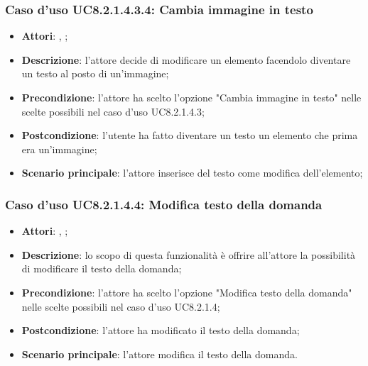 		\subsubsection{Caso d'uso UC8.2.1.4.3.4: Cambia immagine in testo}
		\label{UC8.2.1.4.3.4}
		\begin{itemize}
			\item \textbf{Attori}: \uau, \uaupro;
			\item \textbf{Descrizione}: l'attore decide di modificare un elemento facendolo diventare un testo al posto di un'immagine;
			\item \textbf{Precondizione}: l'attore ha scelto l'opzione "Cambia immagine in testo" nelle scelte possibili nel caso d'uso UC8.2.1.4.3;
			\item \textbf{Postcondizione}: l'utente ha fatto diventare un testo un elemento che prima era un'immagine;
			\item \textbf{Scenario principale}: l'attore inserisce del testo come modifica dell'elemento;  
		\end{itemize}
		
			
	\subsubsection{Caso d'uso UC8.2.1.4.4: Modifica testo della domanda}
	\begin{itemize}
		\item
		\textbf{Attori}: \uau, \uaupro;
		\item		
		\textbf{Descrizione}: lo scopo di questa funzionalità è offrire all'attore la possibilità di modificare il testo della domanda;
		\item
		\textbf{Precondizione}: l'attore ha scelto l'opzione "Modifica testo della domanda" nelle scelte possibili nel caso d'uso UC8.2.1.4;
		\item \textbf{Postcondizione}: l'attore ha modificato il testo della domanda;
		\item \textbf{Scenario principale}: l'attore modifica il testo della domanda. 
		
	\end{itemize}
